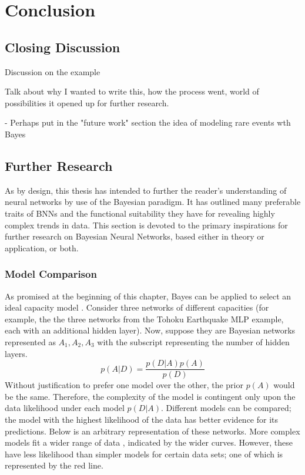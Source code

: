 \chapter{Conclusion}



\section{Closing Discussion}

Discussion on the example

Talk about why I wanted to write this, how the process went, world of possibilities it opened up for further research.

- Perhaps put in the "future work" section the idea of modeling rare events wth Bayes



\section{Further Research}


As by design, this thesis has intended to further the reader's understanding of neural networks by use of the Bayesian paradigm.  It has outlined many preferable traits of BNNs and the functional suitability they have for revealing highly complex trends in data.
This section is devoted to the primary inspirations for further research on Bayesian Neural Networks, based either in theory or application, or both.

\subsection{Model Comparison}
As promised at the beginning of this chapter, Bayes can be applied to select an ideal capacity model \cite{bishop1997bayesian}.  Consider three networks of different capacities (for example, the the three networks from the Tohoku Earthquake MLP example, each with an additional hidden layer).  Now, suppose they are Bayesian networks represented as $A_1, A_2, A_3$ with the subscript representing the number of hidden layers.
$$
p(A|D) = \frac{p(D|A)p(A)}{p(D)}
$$
Without justification to prefer one model over the other, the prior $p(A)$ would be the same.  Therefore, the complexity of the model is contingent only upon the data likelihood under each model $p(D|A)$.  Different models can be compared; the model with the highest likelihood of the data has better evidence for its predictions. Below is an arbitrary representation of these networks.  More complex models fit a wider range of data \cite{bishop1997bayesian}, indicated by the wider curves.  However, these have less likelihood than simpler models for certain data sets; one of which is represented by the red line.

